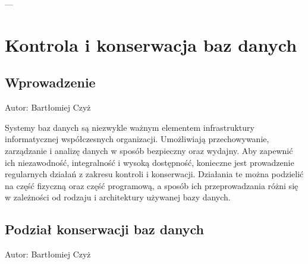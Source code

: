 \documentclass[letterpaper,10pt,polish]{sphinxmanual}
\begin{document}
\sphinxAtStartPar
—

\sphinxstepscope


\section{Kontrola i konserwacja baz danych}
\label{\detokenize{rozdzial2/Kontrola_i_konserwacja/kontrola_i_konserwacja:kontrola-i-konserwacja-baz-danych}}\label{\detokenize{rozdzial2/Kontrola_i_konserwacja/kontrola_i_konserwacja::doc}}

\subsection{Wprowadzenie}
\label{\detokenize{rozdzial2/Kontrola_i_konserwacja/kontrola_i_konserwacja:wprowadzenie}}
\sphinxAtStartPar
Autor: Bartłomiej Czyż

\sphinxAtStartPar
Systemy baz danych są niezwykle ważnym elementem infrastruktury informatycznej współczesnych organizacji. Umożliwiają przechowywanie, zarządzanie i analizę danych w sposób bezpieczny oraz wydajny. Aby zapewnić ich niezawodność, integralność i wysoką dostępność, konieczne jest prowadzenie regularnych działań z zakresu kontroli i konserwacji. Działania te można podzielić na część fizyczną oraz część programową, a sposób ich przeprowadzania różni się w zależności od rodzaju i architektury używanej bazy danych.


\subsection{Podział konserwacji baz danych}
\label{\detokenize{rozdzial2/Kontrola_i_konserwacja/kontrola_i_konserwacja:podzial-konserwacji-baz-danych}}
\sphinxAtStartPar
Autor: Bartłomiej Czyż
\end{document}
